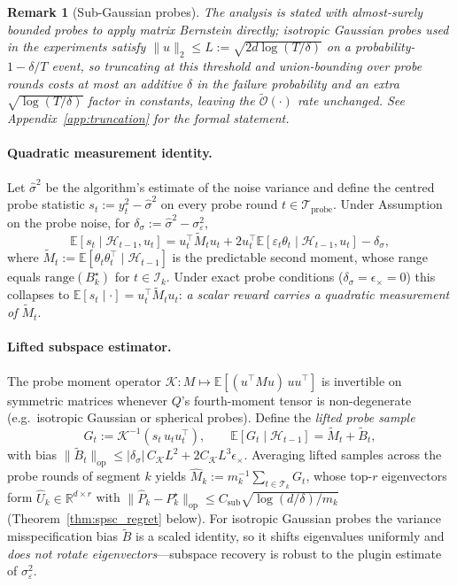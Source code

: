 \documentclass{article}
\newcommand{\R}{\mathbb{R}}
\newcommand{\E}{\mathbb{E}}
\newcommand{\op}{\mathrm{op}}
\newcommand{\cH}{\mathcal{H}}
\newcommand{\cT}{\mathcal{T}}
\newcommand{\cI}{\mathcal{I}}
\newcommand{\cTprobe}{\mathcal{T}_{\mathrm{probe}}}
\newcommand{\tilO}{\widetilde{\mathcal{O}}}
\newcommand{\range}{\mathrm{range}}
\newtheorem{remark}{Remark}
\begin{document}
\begin{remark}[Sub-Gaussian probes]
\label{rem:subgauss_probe}
The analysis is stated with almost-surely bounded probes to apply
matrix Bernstein directly; isotropic Gaussian probes used in the
experiments satisfy $\|u\|_2\le L:=\sqrt{2d\log(T/\delta)}$ on a
probability-$1{-}\delta/T$ event, so truncating at this threshold and
union-bounding over probe rounds costs at most an additive $\delta$ in
the failure probability and an extra $\sqrt{\log(T/\delta)}$ factor in
constants, leaving the $\tilO(\cdot)$ rate unchanged. See
Appendix~\ref{app:truncation} for the formal statement.
\end{remark}

\paragraph{Quadratic measurement identity.}
Let $\hat\sigma^2$ be the algorithm's estimate of the noise variance
and define the centred probe statistic $s_t := y_t^2 - \hat\sigma^2$
on every probe round $t\in\cTprobe$. Under Assumption on the probe
noise, for $\delta_\sigma := \hat\sigma^2-\sigma_\varepsilon^2$,
\begin{equation}
\E[s_t \mid \cH_{t-1},u_t]
  = u_t^\top \widetilde{M}_t u_t + 2 u_t^\top
    \E[\varepsilon_t\theta_t\mid\cH_{t-1},u_t] - \delta_\sigma,
\label{eq:quad_identity}
\end{equation}
where $\widetilde{M}_t := \E[\theta_t\theta_t^\top\mid \cH_{t-1}]$
is the predictable second moment, whose range equals $\range(B_k^\star)$
for $t\in\cI_k$. Under exact probe conditions
($\delta_\sigma = \epsilon_\times = 0$) this collapses to
$\E[s_t\mid\cdot] = u_t^\top\widetilde M_t u_t$: \emph{a scalar reward
carries a quadratic measurement of $\widetilde M_t$}.

\paragraph{Lifted subspace estimator.}
The probe moment operator $\mathcal K : M \mapsto \E[(u^\top M u)\,uu^\top]$
is invertible on symmetric matrices whenever $Q$'s fourth-moment tensor is
non-degenerate (e.g.\ isotropic Gaussian or spherical probes). Define the
\emph{lifted probe sample}
\begin{equation}
G_t := \mathcal K^{-1}(s_t\,u_tu_t^\top),\qquad
\E[G_t\mid \cH_{t-1}] = \widetilde M_t + \widetilde B_t,
\label{eq:lifted_sample}
\end{equation}
with bias $\|\widetilde B_t\|_\op \le |\delta_\sigma|\,C_{\mathcal K}L^2
+ 2C_{\mathcal K}L^3\epsilon_\times$. Averaging lifted samples across
the probe rounds of segment $k$ yields
$\widehat M_k := m_k^{-1}\sum_{t\in\cT_k} G_t$, whose top-$r$ eigenvectors
form $\widehat U_k\in\R^{d\times r}$ with
$\|\widehat P_k - P_k^\star\|_\op \le C_{\mathrm{sub}}\sqrt{\log(d/\delta)/m_k}$
(Theorem~\ref{thm:spsc_regret} below).
For isotropic Gaussian probes the variance misspecification bias
$\widetilde B$ is a scaled identity, so it shifts eigenvalues uniformly
and \emph{does not rotate eigenvectors}---subspace recovery is robust to
the plugin estimate of $\sigma_\varepsilon^2$.
\end{document}
